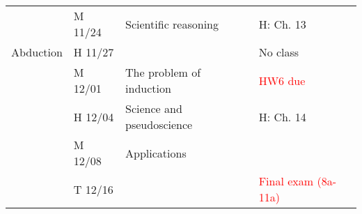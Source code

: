 \documentclass{article}
\begin{document}
\begin{tabular}{|l|l|l|l|}
\hline 
\multirow{3}{*}{Abduction}

 & M 11/24 & Scientific reasoning & H: Ch. 13 \\
 & H 11/27 & & No class \\
 & M 12/01 & The problem of induction & \textcolor{red}{HW6 due} \\
 & H 12/04 & Science and pseudoscience & H: Ch. 14 \\
 & M 12/08 & Applications & \\
 & T 12/16 & & \textcolor{red}{Final exam (8a-11a)} \\

\hline

\end{tabular}
\end{document}

